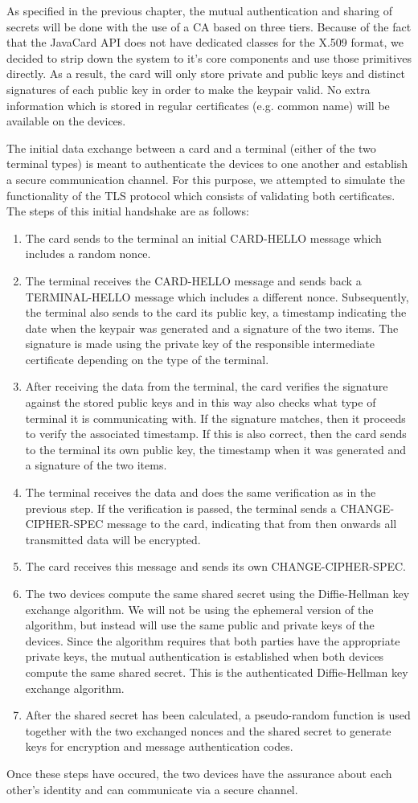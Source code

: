 As specified in the previous chapter, the mutual authentication and sharing of secrets will be done with the use of a CA based on three tiers. Because of the fact that the JavaCard API does not have dedicated classes for the X.509 format, we decided to strip down the system to it's core components and use those primitives directly. As a result, the card will only store private and public keys and distinct signatures of each public key in order to make the keypair valid. No extra information which is stored in regular certificates (e.g. common name) will be available on the devices.

The initial data exchange between a card and a terminal (either of the two terminal types) is meant to authenticate the devices to one another and establish a secure communication channel. For this purpose, we attempted to simulate the functionality of the TLS protocol which consists of validating both certificates. The steps of this initial handshake are as follows:
\begin{enumerate}
 \item The card sends to the terminal an initial CARD-HELLO message which includes a random nonce.
 \item The terminal receives the CARD-HELLO message and sends back a TERMINAL-HELLO message which includes a different nonce. Subsequently, the terminal also sends to the card its public key, a timestamp indicating the date when the keypair was generated and a signature of the two items. The signature is made using the private key of the responsible intermediate certificate depending on the type of the terminal.
 \item After receiving the data from the terminal, the card verifies the signature against the stored public keys and in this way also checks what type of terminal it is communicating with. If the signature matches, then it proceeds to verify the associated timestamp. If this is also correct, then the card sends to the terminal its own public key, the timestamp when it was generated and a signature of the two items.
 \item The terminal receives the data and does the same verification as in the previous step. If the verification is passed, the terminal sends a CHANGE-CIPHER-SPEC message to the card, indicating that from then onwards all transmitted data will be encrypted.
 \item The card receives this message and sends its own CHANGE-CIPHER-SPEC.
 \item The two devices compute the same shared secret using the Diffie-Hellman key exchange algorithm. We will not be using the ephemeral version of the algorithm, but instead will use the same public and private keys of the devices. Since the algorithm requires that both parties have the appropriate private keys, the mutual authentication is established when both devices compute the same shared secret. This is the authenticated Diffie-Hellman key exchange algorithm.
 \item After the shared secret has been calculated, a pseudo-random function is used together with the two exchanged nonces and the shared secret to generate keys for encryption and message authentication codes.
\end{enumerate}

Once these steps have occured, the two devices have the assurance about each other's identity and can communicate via a secure channel.
